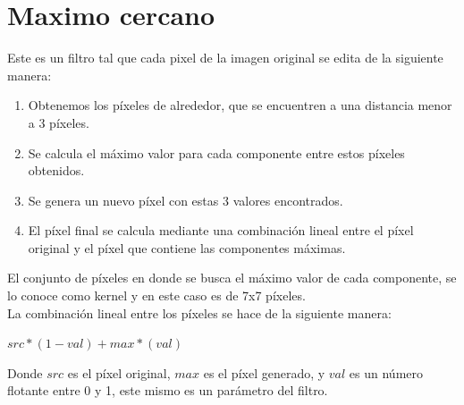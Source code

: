 \section{Maximo cercano}

Este es un filtro tal que cada pixel de la imagen original se edita de la siguiente manera:

\begin{enumerate}
	\item Obtenemos los píxeles de alrededor, que se encuentren a una distancia menor a 3 píxeles.
	\item Se calcula el máximo valor para cada componente entre estos píxeles obtenidos.
	\item Se genera un nuevo píxel con estas 3 valores encontrados.
	\item El píxel final se calcula mediante una combinación lineal entre el píxel original y el píxel que contiene las componentes máximas.
\end{enumerate}

El conjunto de píxeles en donde se busca el máximo valor de cada componente, se lo conoce como kernel y en este caso es de 7x7 píxeles.\\
La combinación lineal entre los píxeles se hace de la siguiente manera:
\begin{center}
$src * (1 - val) + max * (val)$
\end{center}
Donde $src$ es el píxel original, $max$ es el píxel generado, y $val$ es un número flotante entre 0 y 1, este mismo es un parámetro del filtro.

